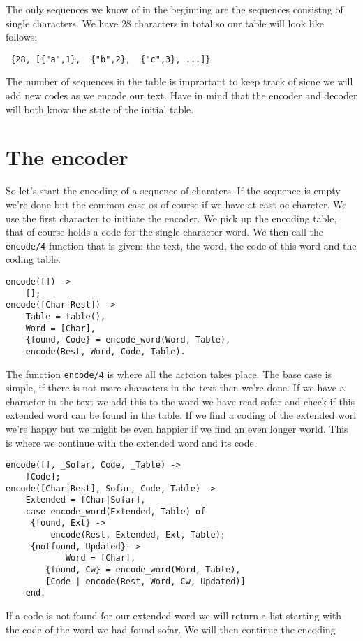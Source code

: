 \documentclass[a4paper,11pt]{article}
\begin{document}
The only sequences we know of in the beginning are the sequences
consistng of single characters. We have $28$ characters in total so
our table will look like follows:

\begin{verbatim}
 {28, [{"a",1},  {"b",2},  {"c",3}, ...]}
\end{verbatim}

The number of sequences in the table is imprortant to keep track of
sicne we will add new codes as we encode our text. Have in mind that
the encoder and decoder will both know the state of the initial table.


\section{The encoder}

So let's start the encoding of a sequence of charaters. If the
sequence is empty we're done but the common case os of course if we
have at east oe charcter. We use the first character to initiate the
encoder. We pick up the encoding table, that of course holds a code
for the single character word. We then call the {\tt encode/4}
function that is given: the text, the word, the code of this word and
the coding table.

\begin{verbatim}
encode([]) ->
    [];
encode([Char|Rest]) ->
    Table = table(),
    Word = [Char],
    {found, Code} = encode_word(Word, Table),
    encode(Rest, Word, Code, Table).
\end{verbatim}

The function {\tt encode/4} is where all the actoion takes place. The
base case is simple, if there is not more characters in the text then
we're done. If we have a character in the text we add this to the
word we have read sofar and check if this extended word can be found
in the table. If we find a coding of the extended worl we're happy but we
might be even happier if we find an even longer world. This is
where we continue with the extended word and its code. 

\begin{verbatim}
encode([], _Sofar, Code, _Table) ->
    [Code];
encode([Char|Rest], Sofar, Code, Table) ->
    Extended = [Char|Sofar],
    case encode_word(Extended, Table) of
	 {found, Ext} ->
	     encode(Rest, Extended, Ext, Table);
	 {notfound, Updated} ->
            Word = [Char],
	    {found, Cw} = encode_word(Word, Table),
	    [Code | encode(Rest, Word, Cw, Updated)]
    end.
\end{verbatim}

If a code is not found for our extended word we will return a list
starting with the code of the word we had found sofar. We will then continue
the encoding 
\end{document}
